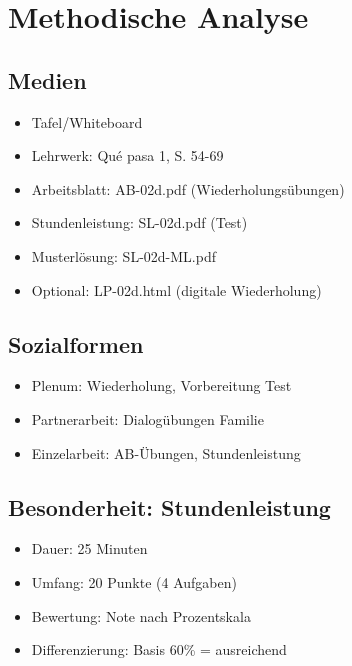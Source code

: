\documentclass[11pt,a4paper]{article}
\newcommand{\lehrwerk}{Qué pasa 1}
\newcommand{\lehrwerkseite}{S. 54-69}
\begin{document}
\section{Methodische Analyse}

\subsection{Medien}
\begin{itemize}
    \item Tafel/Whiteboard
    \item Lehrwerk: \lehrwerk, \lehrwerkseite
    \item Arbeitsblatt: AB-02d.pdf (Wiederholungsübungen)
    \item Stundenleistung: SL-02d.pdf (Test)
    \item Musterlösung: SL-02d-ML.pdf
    \item Optional: LP-02d.html (digitale Wiederholung)
\end{itemize}

\subsection{Sozialformen}
\begin{itemize}
    \item Plenum: Wiederholung, Vorbereitung Test
    \item Partnerarbeit: Dialogübungen Familie
    \item Einzelarbeit: AB-Übungen, Stundenleistung
\end{itemize}

\subsection{Besonderheit: Stundenleistung}
\begin{itemize}
    \item Dauer: 25 Minuten
    \item Umfang: 20 Punkte (4 Aufgaben)
    \item Bewertung: Note nach Prozentskala
    \item Differenzierung: Basis 60\% = ausreichend
\end{itemize}

\end{document}
